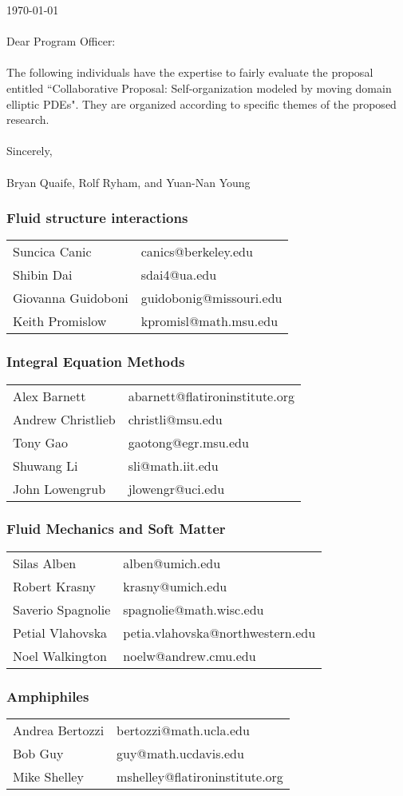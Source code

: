 \documentclass[11pt]{article}
\begin{document}
\sloppy

\noindent
\today \\ \\
Dear Program Officer:
\\ \\
\noindent
The following individuals have the expertise to fairly evaluate the 
proposal entitled ``Collaborative Proposal: Self-organization modeled by
moving domain elliptic PDEs". They are organized according to specific
themes of the proposed research.
\\ \\
Sincerely, \\ \\
Bryan Quaife, Rolf Ryham, and Yuan-Nan Young \\

\subsubsection*{Fluid structure interactions}
\begin{tabular}{ll}
  Suncica Canic & canics@berkeley.edu \\
  Shibin Dai & sdai4@ua.edu \\
  Giovanna Guidoboni \qquad & guidobonig@missouri.edu \\
  Keith Promislow & kpromisl@math.msu.edu
\end{tabular}


\subsubsection*{Integral Equation Methods}
\begin{tabular}{ll}
  Alex Barnett & abarnett@flatironinstitute.org \\
  Andrew Christlieb \qquad &christli@msu.edu \\
  Tony Gao & gaotong@egr.msu.edu \\
  Shuwang Li & sli@math.iit.edu \\
  John Lowengrub & jlowengr@uci.edu
\end{tabular}


\subsubsection*{Fluid Mechanics and Soft Matter}
\begin{tabular}{ll}
Silas Alben & alben@umich.edu \\
Robert Krasny & krasny@umich.edu \\
Saverio Spagnolie \qquad & spagnolie@math.wisc.edu \\
Petial Vlahovska & petia.vlahovska@northwestern.edu \\
Noel Walkington & noelw@andrew.cmu.edu 
\end{tabular}


\subsubsection*{Amphiphiles}
\begin{tabular}{ll}
Andrea Bertozzi & bertozzi@math.ucla.edu \\
Bob Guy & guy@math.ucdavis.edu \\
Mike Shelley & mshelley@flatironinstitute.org 
\end{tabular}
\end{document}
